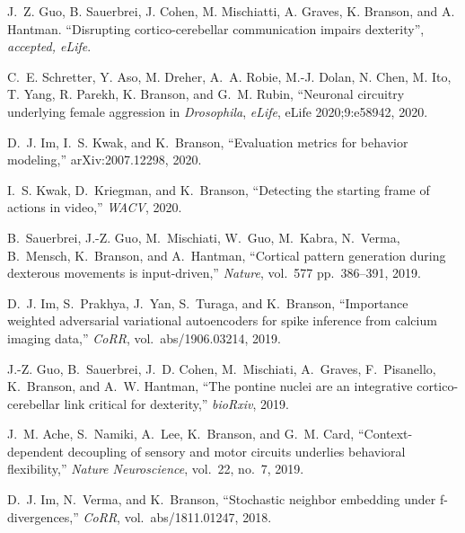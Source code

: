 \begin{cvenum}

\item J.~Z. Guo, B. Sauerbrei, J. Cohen, M. Mischiatti, A. Graves, K. Branson, and A. Hantman. ``Disrupting cortico-cerebellar communication impairs dexterity'', {\em accepted,  eLife}.
  
\item C.~E. Schretter, Y. Aso, M. Dreher, A.~A. Robie, M.-J. Dolan, N. Chen, M. Ito, T. Yang, R. Parekh, K. Branson, and G.~M. Rubin, ``Neuronal circuitry underlying female aggression in {\em {{D}}rosophila}, {\em eLife}, eLife 2020;9:e58942, 2020.
  
\item D.~J. Im, I.~S. Kwak, and K.~Branson, ``Evaluation metrics for behavior modeling,'' arXiv:2007.12298, 2020.
  
\item I.~S. Kwak, D.~Kriegman, and K.~Branson, ``Detecting the starting frame of actions in video,'' {\em WACV}, 2020.

\item B.~Sauerbrei, J.-Z. Guo, M.~Mischiati, W.~Guo, M.~Kabra, N.~Verma, B.~Mensch, K.~Branson, and A.~Hantman, ``Cortical pattern generation during dexterous movements is input-driven,'' {\em Nature}, vol.~577 pp.~386--391, 2019.

\item D.~J. Im, S.~Prakhya, J.~Yan, S.~Turaga, and K.~Branson, ``Importance weighted
  adversarial variational autoencoders for spike inference from calcium imaging
  data,'' {\em CoRR}, vol.~abs/1906.03214, 2019.

\item J.-Z. Guo, B.~Sauerbrei, J.~D. Cohen, M.~Mischiati, A.~Graves, F.~Pisanello,
  K.~Branson, and A.~W. Hantman, ``The pontine nuclei are an integrative
  cortico-cerebellar link critical for dexterity,'' {\em bioRxiv}, 2019.

\item J.~M. Ache, S.~Namiki, A.~Lee, K.~Branson, and G.~M. Card, ``Context-dependent
  decoupling of sensory and motor circuits underlies behavioral flexibility,''
  {\em Nature Neuroscience}, vol.~22, no.~7, 2019.

\item D.~J. Im, N.~Verma, and K.~Branson, ``Stochastic neighbor embedding under
  f-divergences,'' {\em CoRR}, vol.~abs/1811.01247, 2018.


\end{cvenum}
